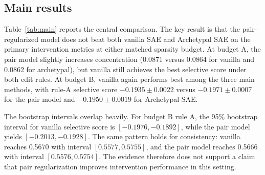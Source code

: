 \subsection{Main results}

Table~\ref{tab:main} reports the central comparison. The key result is that the pair-regularized model does not beat both vanilla SAE and Archetypal SAE on the primary intervention metrics at either matched sparsity budget. At budget A, the pair model slightly increases concentration (0.0871 versus 0.0864 for vanilla and 0.0862 for archetypal), but vanilla still achieves the best selective score under both edit rules. At budget B, vanilla again performs best among the three main methods, with rule-A selective score $-0.1935 \pm 0.0022$ versus $-0.1971 \pm 0.0007$ for the pair model and $-0.1950 \pm 0.0019$ for Archetypal SAE.

The bootstrap intervals overlap heavily. For budget B rule A, the 95\% bootstrap interval for vanilla selective score is $[-0.1976,-0.1892]$, while the pair model yields $[-0.2013,-0.1928]$. The same pattern holds for consistency: vanilla reaches 0.5670 with interval $[0.5577,0.5755]$, and the pair model reaches 0.5666 with interval $[0.5576,0.5754]$. The evidence therefore does not support a claim that pair regularization improves intervention performance in this setting.


